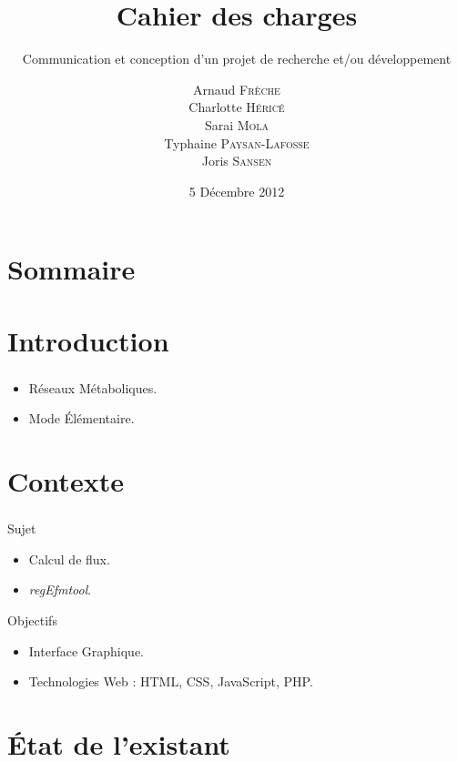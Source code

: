 \documentclass[11pt]{beamer}
\title{\textbf{Cahier des charges}}
\subtitle{Communication et conception d'un projet de recherche et/ou développement}
\date{5 Décembre 2012}
\author{Arnaud \textsc{Frèche} \\ Charlotte \textsc{Héricé} \\ Sarai \textsc{Mola}\\ Typhaine  \textsc{Paysan-Lafosse} \\ Joris \textsc{Sansen}}
\institute[Université Bordeaux 1] {Master 2 BioInformatique}
\begin{document}
\frame{\titlepage}

\section*{Sommaire}

\begin{frame}
  \tableofcontents
\end{frame}

\section{Introduction}			

\begin{frame}
	\frametitle{\secname}
	\begin{itemize}
	\item Réseaux Métaboliques.
	\item Mode Élémentaire.
	\end{itemize}
\end{frame}

\section{Contexte}			

\begin{frame}
	\frametitle{\secname}
	\begin{block}{Sujet}
		\begin{itemize}
		\item Calcul de flux.
		\item \textit{regEfmtool}.
		\end{itemize}
	\end{block}
	\begin{block}{Objectifs}
		\begin{itemize}
		\item Interface Graphique.
		\item Technologies Web : HTML, CSS, JavaScript, PHP.
		\end{itemize}
	\end{block}
\end{frame}

\section{État de l'existant}			
\end{document}
